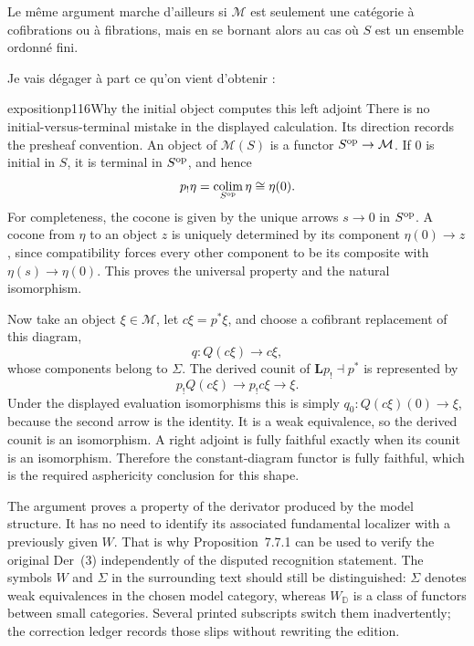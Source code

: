 Le même argument marche d'ailleurs si $\mathcal{M}$ est seulement une catégorie à cofibrations ou à fibrations, mais en se bornant alors au cas où $S$ est un ensemble ordonné fini.

Je vais dégager à part ce qu'on vient d'obtenir :

\begin{dcomment}{exposition}{p116}{Why the initial object computes this left adjoint}
There is no initial-versus-terminal mistake in the displayed calculation. Its direction records the presheaf convention. An object of $\mathcal M(S)$ is a functor $S^{\rm op}\to\mathcal M$. If $0$ is initial in $S$, it is terminal in $S^{\rm op}$, and hence
\[
 p_!\eta=\mathop{\rm colim}_{S^{\rm op}}\eta\cong\eta(0).
\]
For completeness, the cocone is given by the unique arrows $s\to0$ in $S^{\rm op}$. A cocone from $\eta$ to an object $z$ is uniquely determined by its component $\eta(0)\to z$, since compatibility forces every other component to be its composite with $\eta(s)\to\eta(0)$. This proves the universal property and the natural isomorphism.

Now take an object $\xi\in\mathcal M$, let $c\xi=p^*\xi$, and choose a cofibrant replacement of this diagram,
\[
 q:Q(c\xi)\longrightarrow c\xi,
\]
whose components belong to $\Sigma$. The derived counit of $\mathbf Lp_!\dashv p^*$ is represented by
\[
 p_!Q(c\xi)\longrightarrow p_!c\xi\longrightarrow\xi.
\]
Under the displayed evaluation isomorphisms this is simply $q_0:Q(c\xi)(0)\to\xi$, because the second arrow is the identity. It is a weak equivalence, so the derived counit is an isomorphism. A right adjoint is fully faithful exactly when its counit is an isomorphism. Therefore the constant-diagram functor is fully faithful, which is the required asphericity conclusion for this shape.

The argument proves a property of the derivator produced by the model structure. It has no need to identify its associated fundamental localizer with a previously given $W$. That is why Proposition~7.7.1 can be used to verify the original Der~(3) independently of the disputed recognition statement. The symbols $W$ and $\Sigma$ in the surrounding text should still be distinguished: $\Sigma$ denotes weak equivalences in the chosen model category, whereas $W_{\mathbb D}$ is a class of functors between small categories. Several printed subscripts switch them inadvertently; the correction ledger records those slips without rewriting the edition.
\end{dcomment}


